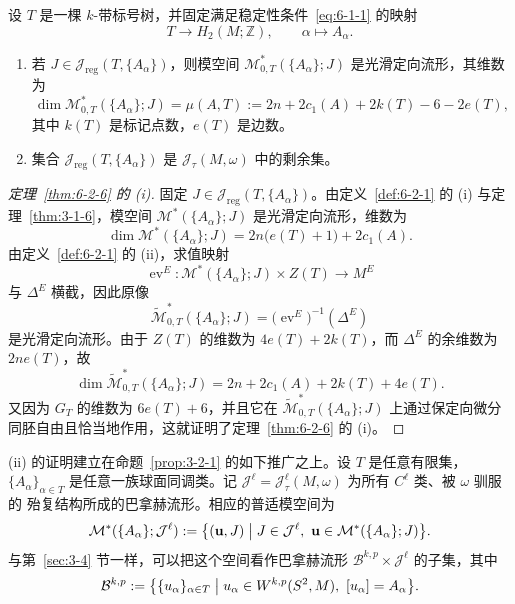 \begin{theorem}\label{thm:6-2-6}
设 $T$ 是一棵 $k$-带标号树，并固定满足稳定性条件~\eqref{eq:6-1-1} 的映射
\[
  T\longrightarrow H_2(M;\mathbb Z),
  \qquad \alpha\longmapsto A_\alpha.
\]
\begin{enumerate}[label=(\roman*),leftmargin=3em]
\item 若 $J\in\mathcal J_{\mathrm{reg}}(T,\{A_\alpha\})$，则模空间
$\mathcal M^*_{0,T}(\{A_\alpha\};J)$ 是光滑定向流形，其维数为
\[
  \dim\mathcal M^*_{0,T}(\{A_\alpha\};J)
  =\mu(A,T):=2n+2c_1(A)+2k(T)-6-2e(T),
\]
其中 $k(T)$ 是标记点数，$e(T)$ 是边数。
\item 集合 $\mathcal J_{\mathrm{reg}}(T,\{A_\alpha\})$ 是
$\mathcal J_\tau(M,\omega)$ 中的剩余集。
\end{enumerate}
\end{theorem}

\begin{proof}[定理~\ref{thm:6-2-6} 的 (i)]
固定 $J\in\mathcal J_{\mathrm{reg}}(T,\{A_\alpha\})$。由定义~\ref{def:6-2-1}
的 (i) 与定理~\ref{thm:3-1-6}，模空间
$\mathcal M^*(\{A_\alpha\};J)$ 是光滑定向流形，维数为
\[
  \dim\mathcal M^*(\{A_\alpha\};J)
  =2n\bigl(e(T)+1\bigr)+2c_1(A).
\]
由定义~\ref{def:6-2-1} 的 (ii)，求值映射
\[
  \operatorname{ev}^E:
  \mathcal M^*(\{A_\alpha\};J)\times Z(T)\longrightarrow M^E
\]
与 $\Delta^E$ 横截，因此原像
\[
  \widetilde{\mathcal M}^*_{0,T}(\{A_\alpha\};J)
  =\bigl(\operatorname{ev}^E\bigr)^{-1}(\Delta^E)
\]
是光滑定向流形。由于 $Z(T)$ 的维数为 $4e(T)+2k(T)$，而 $\Delta^E$ 的余维数为
$2ne(T)$，故
\[
  \dim\widetilde{\mathcal M}^*_{0,T}(\{A_\alpha\};J)
  =2n+2c_1(A)+2k(T)+4e(T).
\]
又因为 $G_T$ 的维数为 $6e(T)+6$，并且它在
$\widetilde{\mathcal M}^*_{0,T}(\{A_\alpha\};J)$
上通过保定向微分同胚自由且恰当地作用，这就证明了定理~\ref{thm:6-2-6} 的 (i)。
\end{proof}

(ii) 的证明建立在命题~\ref{prop:3-2-1} 的如下推广之上。设 $T$ 是任意有限集，
$\{A_\alpha\}_{\alpha\in T}$ 是任意一族球面同调类。记
$\mathcal J^\ell=\mathcal J^\ell_\tau(M,\omega)$ 为所有 $C^\ell$ 类、被 $\omega$ 驯服的
殆复结构所成的巴拿赫流形。相应的普适模空间为
\[
  \mathcal M^*(\{A_\alpha\};\mathcal J^\ell)
  :=\bigl\{(\mathbf u,J)\bigm|
    J\in\mathcal J^\ell,
    \ \mathbf u\in\mathcal M^*(\{A_\alpha\};J)\bigr\}.
\]
与第~\ref{sec:3-4} 节一样，可以把这个空间看作巴拿赫流形
$\mathcal B^{k,p}\times\mathcal J^\ell$ 的子集，其中
\[
  \mathcal B^{k,p}
  :=\bigl\{\{u_\alpha\}_{\alpha\in T}\bigm|
  u_\alpha\in W^{k,p}(S^2,M),\ [u_\alpha]=A_\alpha\bigr\}.
\]

